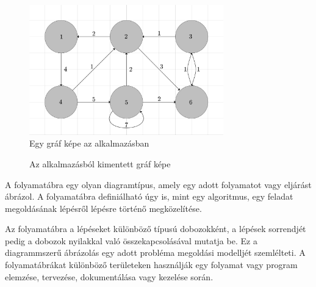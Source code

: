 \begin{figure}[!h]
	\label{fig:graph_editor}
	\centering
	\includegraphics[width=0.75\textwidth]{images/graph.png}
	\caption{Egy gráf képe az alkalmazásban}
\end{figure}

\begin{figure}[!h]
	\label{fig:graph_tikz}
	\centering
	
	\caption{Az alkalmazásból kimentett gráf képe}
\end{figure}


A folyamatábra egy olyan diagramtípus, amely egy adott folyamatot vagy eljárást ábrázol. A folyamatábra definiálható úgy is, mint egy algoritmus, egy feladat megoldásának lépésről lépésre történő megközelítése.

Az folyamatábra a lépéseket különböző típusú dobozokként, a lépések sorrendjét pedig a dobozok nyilakkal való összekapcsolásával mutatja be. Ez a diagrammszerű ábrázolás egy adott probléma megoldási modelljét szemlélteti. A folyamatábrákat különböző területeken használják egy folyamat vagy program elemzése, tervezése, dokumentálása vagy kezelése során.


